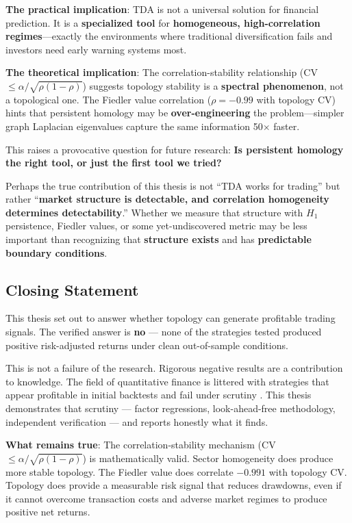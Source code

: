 \textbf{The practical implication}: TDA is not a universal solution for financial prediction. It is a \textbf{specialized tool} for \textbf{homogeneous, high-correlation regimes}---exactly the environments where traditional diversification fails and investors need early warning systems most.

\textbf{The theoretical implication}: The correlation-stability relationship (CV $\leq \alpha/\sqrt{\rho(1-\rho)}$) suggests topology stability is a \textbf{spectral phenomenon}, not a topological one. The Fiedler value correlation ($\rho = -0.99$ with topology CV) hints that persistent homology may be \textbf{over-engineering} the problem---simpler graph Laplacian eigenvalues capture the same information 50$\times$ faster.

This raises a provocative question for future research: \textbf{Is persistent homology the right tool, or just the first tool we tried?}

Perhaps the true contribution of this thesis is not ``TDA works for trading'' but rather ``\textbf{market structure is detectable, and correlation homogeneity determines detectability}.'' Whether we measure that structure with $H_1$ persistence, Fiedler values, or some yet-undiscovered metric may be less important than recognizing that \textbf{structure exists} and has \textbf{predictable boundary conditions}.

\subsection{Closing Statement}

This thesis set out to answer whether topology can generate profitable trading signals. The verified answer is \textbf{no} --- none of the strategies tested produced positive risk-adjusted returns under clean out-of-sample conditions.

This is not a failure of the research. Rigorous negative results are a contribution to knowledge. The field of quantitative finance is littered with strategies that appear profitable in initial backtests and fail under scrutiny \citep{Harvey2016, Bailey2014}. This thesis demonstrates that scrutiny --- factor regressions, look-ahead-free methodology, independent verification --- and reports honestly what it finds.

\textbf{What remains true}: The correlation-stability mechanism (CV $\leq \alpha/\sqrt{\rho(1-\rho)}$) is mathematically valid. Sector homogeneity does produce more stable topology. The Fiedler value does correlate $-0.991$ with topology CV. Topology does provide a measurable risk signal that reduces drawdowns, even if it cannot overcome transaction costs and adverse market regimes to produce positive net returns.

